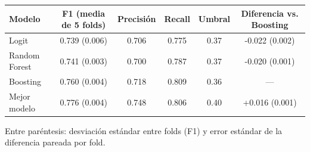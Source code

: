 
\begin{threeparttable}
\begin{tabular}[t]{lccccc}
\toprule
Modelo & F1 (media de 5 folds) & Precisión & Recall & Umbral & Diferencia vs. Boosting\\
\midrule
Logit & 0.739 (0.006) & 0.706 & 0.775 & 0.37 & -0.022 (0.002)\\
Random Forest & 0.741 (0.003) & 0.700 & 0.787 & 0.37 & -0.020 (0.001)\\
Boosting & 0.760 (0.004) & 0.718 & 0.809 & 0.36 & ---\\
\midrule
Mejor modelo & 0.776 (0.004) & 0.748 & 0.806 & 0.40 & +0.016 (0.001)\\
\bottomrule
\end{tabular}
\begin{tablenotes}
\item Entre paréntesis: desviación estándar entre folds (F1) y error estándar de la diferencia pareada por fold.
\end{tablenotes}
\end{threeparttable}
